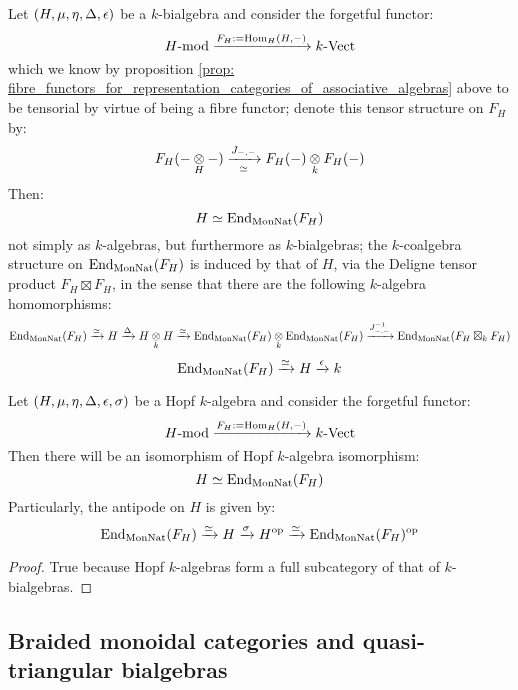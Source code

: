         \begin{theorem} \label{theorem: fibre_functors_for_representation_categories_of_bialgebras}
            Let $(H, \mu, \eta, \Delta, \epsilon)$ be a $k$-bialgebra and consider the forgetful functor:
                $$H\text{-}\mathrm{mod} \xrightarrow[]{F_H := \mathrm{Hom}_H(H, -)} k\text{-}\mathrm{Vect}$$
            which we know by proposition \ref{prop: fibre_functors_for_representation_categories_of_associative_algebras} above to be tensorial by virtue of being a fibre functor; denote this tensor structure on $F_H$ by:
                $$F_H(- \tensor_H -) \xrightarrow[\cong]{J_{-, -}} F_H(-) \tensor_k F_H(-)$$
            Then:
                $$H \simeq \mathrm{End}_{\mathrm{Mon}\mathrm{Nat}}(F_H)$$
            not simply as $k$-algebras, but furthermore as $k$-bialgebras; the $k$-coalgebra structure on $\mathrm{End}_{\mathrm{Mon}\mathrm{Nat}}(F_H)$ is induced by that of $H$, via the Deligne tensor product $F_H \boxtimes F_H$, in the sense that there are the following $k$-algebra homomorphisms:
                $$\End_{\Mon\Nat}(F_H) \xrightarrow[]{\cong} H \xrightarrow[]{\Delta} H \tensor_k H \xrightarrow[]{\cong} \End_{\Mon\Nat}(F_H) \tensor_k \End_{\Mon\Nat}(F_H) \xrightarrow[]{J_{-, -}^{-1}} \End_{\Mon\Nat}(F_H \boxtimes_k F_H)$$
                $$\mathrm{End}_{\mathrm{Mon}\mathrm{Nat}}(F_H) \xrightarrow[]{\simeq} H \xrightarrow[]{\epsilon} k$$
        \end{theorem}
        \begin{corollary} \label{coro: fibre_functors_for_representation_categories_of_hopf_algebras}
            Let $(H, \mu, \eta, \Delta, \epsilon, \sigma)$ be a Hopf $k$-algebra and consider the forgetful functor:
                $$H\text{-}\mathrm{mod} \xrightarrow[]{F_H := \mathrm{Hom}_H(H, -)} k\text{-}\mathrm{Vect}$$
            Then there will be an isomorphism of Hopf $k$-algebra isomorphism:
                $$H \simeq \mathrm{End}_{\mathrm{Mon}\mathrm{Nat}}(F_H)$$
            Particularly, the antipode on $H$ is given by:
                $$\mathrm{End}_{\mathrm{Mon}\mathrm{Nat}}(F_H) \xrightarrow[]{\simeq} H \xrightarrow[]{\sigma} H^{\mathrm{op}} \xrightarrow[]{\simeq} \mathrm{End}_{\mathrm{Mon}\mathrm{Nat}}(F_H)^{\mathrm{op}}$$
        \end{corollary}
            \begin{proof}
                True because Hopf $k$-algebras form a full subcategory of that of $k$-bialgebras. 
            \end{proof}
    
    \subsection{Braided monoidal categories and quasi-triangular bialgebras}


